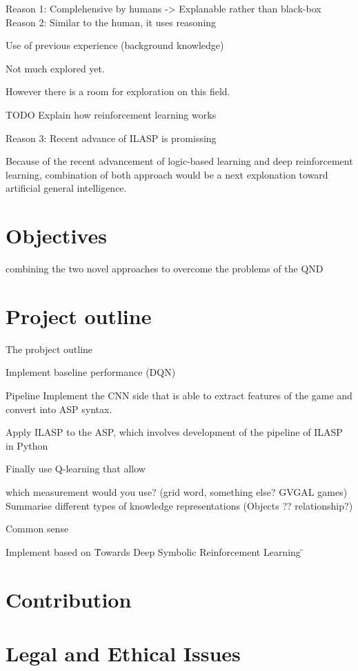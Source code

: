 \documentclass[12pt,twoside]{report}
\begin{document}
Reason 1: Complehensive by humans -> Explanable rather than black-box
Reason 2: Similar to the human, it uses reasoning

Use of previous experience (background knowledge)

Not much explored yet.

However there is a room for exploration on this field.

TODO Explain how reinforcement learning works

Reason 3: Recent advance of ILASP is promissing

Because of the recent advancement of logic-based learning and deep reinforcement learning, combination of both approach would be a next explonation toward artificial general intelligence.


\section{Objectives}

combining the two novel approaches to overcome the problems of the QND

\section{Project outline}

The probject outline

Implement baseline performance (DQN)


Pipeline
Implement the CNN side that is able to extract features of the game and convert into ASP syntax.


Apply ILASP to the ASP, which involves development of the pipeline of ILASP in Python

Finally use Q-learning that allow



which measurement would you use? (grid word, something else? GVGAL games)
Summarise different types of knowledge representations (Objects ?? relationship?)

Common sense

Implement based on \"Towards Deep Symbolic Reinforcement Learning \"

\section{Contribution}


\section{Legal and Ethical Issues}
\end{document}
